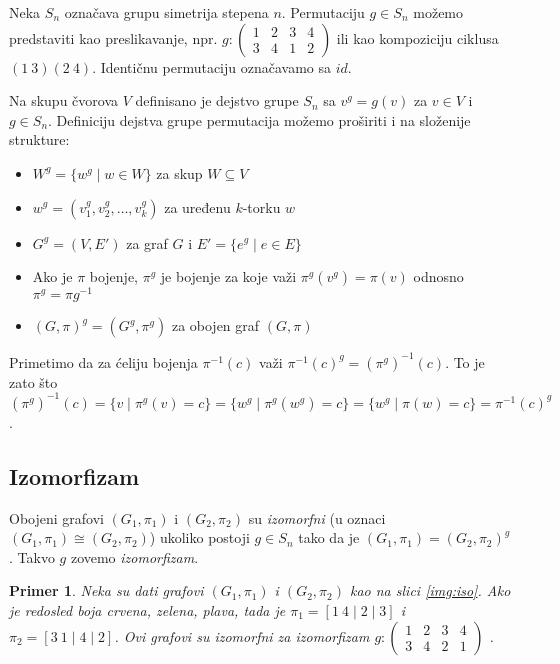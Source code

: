 \documentclass[12pt,oneside]{memoir}
\newtheorem{example}{Primer}
\theoremstyle{definition}
\begin{document}
   Neka $S_n$ označava grupu simetrija stepena $n$. Permutaciju $g \in S_n$
   možemo predstaviti kao preslikavanje, npr.  $g : \begin{pmatrix} 1 & 2 & 3 &
   4\\ 3 & 4 & 1 & 2 \end{pmatrix}$ ili kao kompoziciju ciklusa $(1\ 3)(2\ 4)$.
   Identičnu permutaciju označavamo sa $id$.

   Na skupu čvorova $V$ definisano je dejstvo grupe $S_n$ sa $v^g = g(v)$ za $v
   \in V$ i $g \in S_n$.  Definiciju dejstva grupe permutacija možemo proširiti
   i na složenije strukture:
   \begin{itemize}
       \item $W^g = \{w^g \mid w \in W\}$ za skup $W \subseteq V$
       \item $w^g = (v_1^g, v_2^g, \dots, v_k^g)$ za uređenu $k$-torku $w$
       \item $G^g = (V, E')$ za graf $G$ i $E' = \{e^g \mid e \in E\}$
       \item Ako je $\pi$ bojenje, $\pi^g$ je bojenje za koje važi
		   $\pi^g(v^g)=\pi(v)$ odnosno $\pi^g=\pi g^{-1}$
       \item $(G, \pi)^g = (G^g, \pi^g)$ za obojen graf $(G, \pi)$
   \end{itemize}
   Primetimo da za ćeliju bojenja $\pi^{-1}(c)$ važi $\pi^{-1}(c)^g =
   (\pi^g)^{-1}(c)$. To je zato što $(\pi^g)^{-1}(c) = \{v \mid \pi^g(v) = c\}
   = \{w^g \mid \pi^g(w^g) = c\} = \{w^g \mid \pi(w) = c\} = \pi^{-1}(c)^g$. 


   \subsection{Izomorfizam}

   Obojeni grafovi $(G_1, \pi_1)$ i $(G_2, \pi_2)$ su \emph{izomorfni} (u oznaci
   $(G_1, \pi_1) \cong (G_2, \pi_2)$) ukoliko postoji $g \in S_n$ tako da je
   $(G_1, \pi_1) = (G_2, \pi_2)^g$. Takvo $g$ zovemo \emph{izomorfizam}.

   \begin{example}
	   Neka su dati grafovi $(G_1, \pi_1)$ i $(G_2, \pi_2)$ kao na slici
	   \ref{img:iso}. Ako je redosled boja crvena, zelena, plava, tada je
	   $\pi_1 = [1\ 4\mid 2 \mid 3]$ i $\pi_2 = [3\ 1 \mid 4 \mid 2]$. Ovi
	   grafovi su izomorfni za izomorfizam
	   $g :
	   \begin{pmatrix}
		   1 & 2 & 3 & 4\\
		   3 & 4 & 2 & 1
	   \end{pmatrix}$
	   .
   \end{example}
\end{document}
